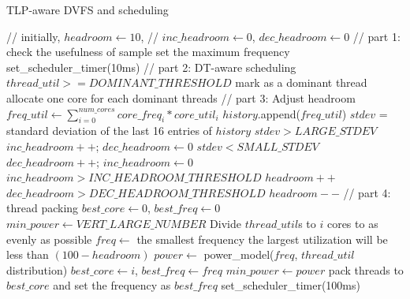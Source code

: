 \begin{algorithm}[t]
\caption{TLP-aware DVFS and scheduling}
\label{algo:tlpdvfs}
\begin{algorithmic}
{\footnotesize
\STATE // initially, $headroom \gets 10$,
\STATE // $inc\_headroom \gets 0$, $dec\_headroom \gets 0$
\STATE
\STATE // part 1: check the usefulness of sample
\STATE set the maximum frequency
\STATE set\_scheduler\_timer(10ms)
\RETURN
\ENDIF
\STATE
\STATE // part 2: DT-aware scheduling
 $thread\_util >= DOMINANT\_THRESHOLD$ %
\STATE \quad mark as a dominant thread
\ENDFOR
\STATE allocate one core for each dominant threads
\STATE
\STATE // part 3: Adjust headroom 
\STATE $freq\_util \gets \sum_{i=0}^{num\_cores} core\_freq_i * core\_util_i$
\STATE $history$.append($freq\_util$)
\STATE $stdev$ = standard deviation of the last 16 entries of $history$
 $stdev > LARGE\_STDEV$
\STATE {} $inc\_headroom++$; $dec\_headroom \gets 0$
 $stdev < SMALL\_STDEV$
\STATE {} $dec\_headroom++$; $inc\_headroom \gets 0$
\STATE
{} $inc\_headroom > INC\_HEADROOM\_THRESHOLD$
\STATE {} $headroom++$
 $dec\_headroom > DEC\_HEADROOM\_THRESHOLD$
\STATE {} $headroom--$
\STATE
\STATE // part 4: thread packing
\STATE $best\_core \gets 0$, $best\_freq \gets 0$
\STATE $min\_power \gets VERT\_LARGE\_NUMBER$
\STATE Divide $thread\_util$s to $i$ cores to as evenly as possible
\STATE $freq \gets$ the smallest frequency the largest utilization
\STATE \quad\quad\quad\quad will be less than $(100-headroom)$
\STATE $power \gets$ power\_model($freq$, $thread\_util$ distribution)
\STATE $best\_core \gets i$, $best\_freq \gets freq$
\STATE $min\_power \gets power$
\ENDIF
\ENDFOR
\STATE
\STATE pack threads to $best\_core$ and set the frequency as $best\_freq$
\STATE set\_scheduler\_timer(100ms)
\RETURN
}
\end{algorithmic}
\end{algorithm}

